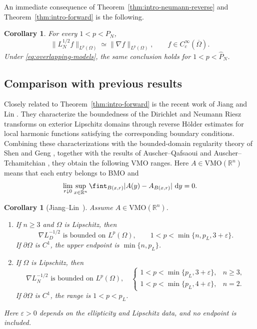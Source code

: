 \documentclass[12pt]{amsart}
\newcommand\R{\mathbb{R}}
\newcommand\dd{\,{\rm d}}
\newtheorem{corollary}[theorem]{Corollary}
\theoremstyle{remark}
\begin{document}
An immediate consequence of Theorem~\ref{thm:intro-neumann-reverse} and Theorem~\ref{thm:intro-forward} is the following.

\begin{corollary}
\label{cor:intro-neumann-equivalence}
For every $1<p<P_N$,
\[
 \|L_N^{1/2}f\|_{L^p(\Omega)}
 \simeq
 \|\nabla f\|_{L^p(\Omega)},
 \qquad f\in C_c^\infty(\overline\Omega).
\]
Under \eqref{eq:overlapping-models}, the same conclusion holds for
$1<p<\widehat P_N$.
\end{corollary}






\subsection*{Comparison with previous results}

Closely related to Theorem~\ref{thm:intro-forward} is the recent work
of Jiang and Lin \cite{JiangLin24}. They characterize the boundedness
of the Dirichlet and Neumann Riesz transforms on exterior Lipschitz
domains through reverse H\"older estimates for local harmonic
functions satisfying the corresponding boundary conditions.
Combining these characterizations with the bounded-domain regularity
theory of Shen \cite{Shen05} and Geng \cite{Geng12}, together with
the results of Auscher--Qafsaoui \cite{AuscherQafsaoui} and
Auscher--Tchamitchian \cite{AuscherTchamitchian01}, they obtain
the following VMO ranges. Here $A\in\mathrm{VMO}(\R^n)$ means
that each entry belongs to BMO and
\[
 \lim_{r\downarrow0}\sup_{x\in\R^n}
 \fint_{B(x,r)}|A(y)-A_{B(x,r)}|\,\dd y=0.
\]

\begin{corollary}[Jiang--Lin~{\cite[Theorems~1.4 and~1.5]{JiangLin24}}]
\label{cor:intro-VMO}
Assume $A\in\mathrm{VMO}(\R^n)$.
\begin{enumerate}[label=\textup{(\roman*)}]
\item If $n\geq3$ and $\Omega$ is Lipschitz, then
\[
 \nabla L_D^{-1/2}\text{ is bounded on }L^p(\Omega),
 \qquad 1<p<\min\{n,p_L,3+\varepsilon\}.
\]
If $\partial\Omega$ is $C^1$, the upper endpoint is
$\min\{n,p_L\}$.
\item If $\Omega$ is Lipschitz, then
\[
 \nabla L_N^{-1/2}\text{ is bounded on }L^p(\Omega),
 \quad
 \begin{cases}
  1<p<\min\{p_L,3+\varepsilon\},&n\geq3,\\
  1<p<\min\{p_L,4+\varepsilon\},&n=2.
 \end{cases}
\]
If $\partial\Omega$ is $C^1$, the range is $1<p<p_L$.
\end{enumerate}
Here $\varepsilon>0$ depends on the ellipticity and Lipschitz data, and no
endpoint is included.
\end{corollary}
\end{document}
